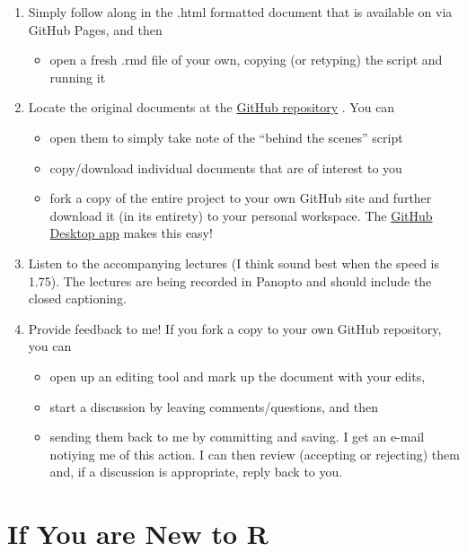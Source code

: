 \documentclass[
  english,
]{book}
\providecommand{\tightlist}{%
  \setlength{\itemsep}{0pt}\setlength{\parskip}{0pt}}
\begin{document}
\begin{enumerate}
\def\labelenumi{\arabic{enumi}.}
\tightlist
\item
  Simply follow along in the .html formatted document that is available on via GitHub Pages, and then

  \begin{itemize}
  \tightlist
  \item
    open a fresh .rmd file of your own, copying (or retyping) the script and running it
  \end{itemize}
\item
  Locate the original documents at the \href{https://github.com/lhbikos/ReC_MultivModel}{GitHub repository} . You can

  \begin{itemize}
  \tightlist
  \item
    open them to simply take note of the ``behind the scenes'' script
  \item
    copy/download individual documents that are of interest to you
  \item
    fork a copy of the entire project to your own GitHub site and further download it (in its entirety) to your personal workspace. The \href{https://desktop.github.com/}{GitHub Desktop app} makes this easy!
  \end{itemize}
\item
  Listen to the accompanying lectures (I think sound best when the speed is 1.75). The lectures are being recorded in Panopto and should include the closed captioning.
\item
  Provide feedback to me! If you fork a copy to your own GitHub repository, you can

  \begin{itemize}
  \tightlist
  \item
    open up an editing tool and mark up the document with your edits,
  \item
    start a discussion by leaving comments/questions, and then
  \item
    sending them back to me by committing and saving. I get an e-mail notiying me of this action. I can then review (accepting or rejecting) them and, if a discussion is appropriate, reply back to you.
  \end{itemize}
\end{enumerate}

\hypertarget{if-you-are-new-to-r}{%
\section{If You are New to R}\label{if-you-are-new-to-r}}
\end{document}
